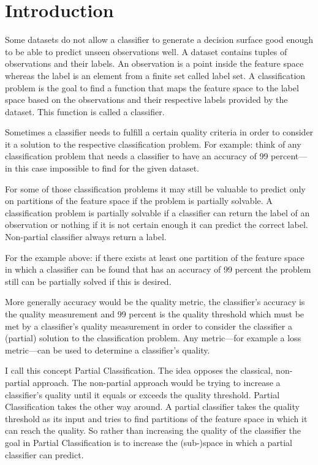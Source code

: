 \section{Introduction}
\label{sec:intro}

Some datasets do not allow a classifier to generate a
decision surface good enough to be able to predict unseen
observations well. A dataset contains tuples of
observations and their labels. An observation is a point
inside the feature space whereas the label is an element
from a finite set called label set. A classification
problem is the goal to find a function that maps the
feature space to the label space based on the observations
and their respective labels provided by the dataset.%
\cite[chapter 18]{ki} This function is called a classifier.

Sometimes a classifier needs to fulfill a certain quality
criteria in order to consider it a solution to the
respective classification problem. For example: think of
any classification problem that needs a classifier to have
an accuracy of 99 percent---in this case impossible to
find for the given dataset.

For some of those classification problems it may still be
valuable to predict only on partitions of the feature
space if the problem is partially solvable. A
classification problem is partially solvable if a
classifier can return the label of an observation or
nothing if it is not certain enough it can predict the
correct label. Non-partial classifier always return a
label.

For the example above: if there exists at least one
partition of the feature space in which a classifier can be
found that has an accuracy of 99 percent the problem still
can be partially solved if this is desired.

More generally accuracy would be the quality metric,
the classifier's accuracy is the quality measurement and 99
percent is the quality threshold which must be met by a
classifier's quality measurement in order to consider the
classifier a (partial) solution to the classification
problem. Any metric---for example a loss metric---can be
used to determine a classifier's quality.

I call this concept Partial Classification. The idea
opposes the classical, non-partial approach. The
non-partial approach would be trying to increase a
classifier's quality until it equals or exceeds the quality
threshold. Partial Classification takes the other way
around. A partial classifier takes the quality threshold as
its input and tries to find partitions of the feature space
in which it can reach the quality. So rather than
increasing the quality of the classifier the goal in
Partial Classification is to increase the (sub-)space in
which a partial classifier can predict.

